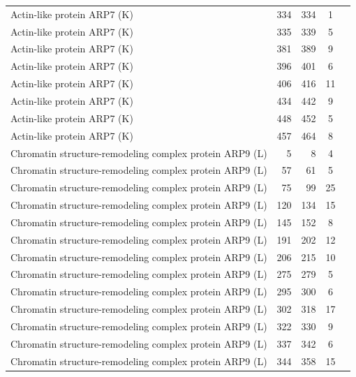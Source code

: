 \begin{longtable}{@{}p{7.5cm}rrrl@{}}
  Actin-like protein ARP7 (K) & 334 & 334 & \multicolumn{1}{c}{1} \\
  Actin-like protein ARP7 (K) & 335 & 339 & \multicolumn{1}{c}{5} \\
  Actin-like protein ARP7 (K) & 381 & 389 & \multicolumn{1}{c}{9} \\
  Actin-like protein ARP7 (K) & 396 & 401 & \multicolumn{1}{c}{6} \\
  Actin-like protein ARP7 (K) & 406 & 416 & \multicolumn{1}{c}{11} \\
  Actin-like protein ARP7 (K) & 434 & 442 & \multicolumn{1}{c}{9} \\
  Actin-like protein ARP7 (K) & 448 & 452 & \multicolumn{1}{c}{5} \\
  Actin-like protein ARP7 (K) & 457 & 464 & \multicolumn{1}{c}{8} \\
  Chromatin structure-remodeling complex protein ARP9 (L) & 5 & 8 & \multicolumn{1}{c}{4} \\
  Chromatin structure-remodeling complex protein ARP9 (L) & 57 & 61 & \multicolumn{1}{c}{5} \\
  Chromatin structure-remodeling complex protein ARP9 (L) & 75 & 99 & \multicolumn{1}{c}{25} \\
  Chromatin structure-remodeling complex protein ARP9 (L) & 120 & 134 & \multicolumn{1}{c}{15} \\
  Chromatin structure-remodeling complex protein ARP9 (L) & 145 & 152 & \multicolumn{1}{c}{8} \\
  Chromatin structure-remodeling complex protein ARP9 (L) & 191 & 202 & \multicolumn{1}{c}{12} \\
  Chromatin structure-remodeling complex protein ARP9 (L) & 206 & 215 & \multicolumn{1}{c}{10} \\
  Chromatin structure-remodeling complex protein ARP9 (L) & 275 & 279 & \multicolumn{1}{c}{5} \\
  Chromatin structure-remodeling complex protein ARP9 (L) & 295 & 300 & \multicolumn{1}{c}{6} \\
  Chromatin structure-remodeling complex protein ARP9 (L) & 302 & 318 & \multicolumn{1}{c}{17} \\
  Chromatin structure-remodeling complex protein ARP9 (L) & 322 & 330 & \multicolumn{1}{c}{9} \\
  Chromatin structure-remodeling complex protein ARP9 (L) & 337 & 342 & \multicolumn{1}{c}{6} \\
  Chromatin structure-remodeling complex protein ARP9 (L) & 344 & 358 & \multicolumn{1}{c}{15} \\

\end{longtable}
